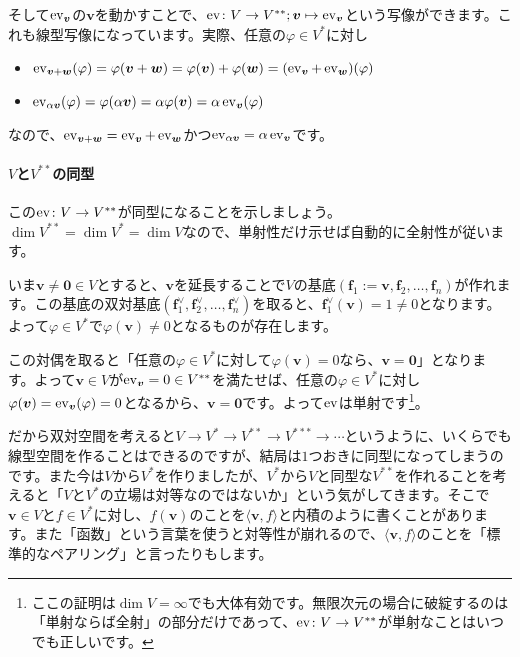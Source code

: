 そして$\operatorname{ev}_{\boldsymbol{v}}$の$\bm{v}$を動かすことで、$\operatorname{ev}\colon V\rightarrow V^{**}; \boldsymbol{v}\mapsto \operatorname{ev}_{\boldsymbol{v}}$という写像ができます。これも線型写像になっています。実際、任意の$\varphi \in V^*$に対し
\begin{itemize}
\item $\operatorname{ev}_{\boldsymbol{v} + \boldsymbol{w}}(\varphi) = \varphi(\boldsymbol{v} + \boldsymbol{w}) = \varphi(\boldsymbol{v}) + \varphi(\boldsymbol{w}) = (\operatorname{ev}_{\boldsymbol{v}} + \operatorname{ev}_{\boldsymbol{w}})(\varphi)$
\item $\operatorname{ev}_{\alpha\boldsymbol{v}}(\varphi) = \varphi(\alpha\boldsymbol{v}) = \alpha \varphi(\boldsymbol{v}) = \alpha \operatorname{ev}_{\boldsymbol{v}}(\varphi)$
\end{itemize}
なので、$\operatorname{ev}_{\boldsymbol{v} + \boldsymbol{w}} = \operatorname{ev}_{\boldsymbol{v}} + \operatorname{ev}_{\boldsymbol{w}}$かつ$\operatorname{ev}_{\alpha\boldsymbol{v}} = \alpha \operatorname{ev}_{\boldsymbol{v}}$です。

\paragraph{$V$と$V^{**}$の同型} この$\operatorname{ev}\colon V\rightarrow V^{**}$が同型になることを示しましょう。$\dim V^{**} = \dim V^* = \dim V$なので、単射性だけ示せば自動的に全射性が従います。

いま$\bm{v} \neq \bm{0} \in V$とすると、$\bm{v}$を延長することで$V$の基底$(\bm{f}_1 := \bm{v}, \bm{f}_2, \ldots, \bm{f}_n)$が作れます。この基底の双対基底$(\bm{f}^{\vee}_1, \bm{f}^{\vee}_2, \ldots, \bm{f}^{\vee}_n)$を取ると、$\bm{f}^{\vee}_1(\bm{v}) = 1 \neq 0$となります。よって$\varphi \in V^*$で$\varphi(\bm{v})\neq 0$となるものが存在します。

この対偶を取ると「任意の$\varphi \in V^*$に対して$\varphi(\bm{v}) = 0$なら、$\bm{v} = \bm{0}$」となります。よって$\bm{v} \in V$が$\operatorname{ev}_{\boldsymbol{v}} = 0 \in V^{**}$を満たせば、任意の$\varphi \in V^*$に対し$\varphi(\boldsymbol{v}) = \operatorname{ev}_{\boldsymbol{v}}(\varphi) = 0$となるから、$\bm{v} = \bm{0}$です。よって$\operatorname{ev}$は単射です\footnote{ここの証明は$\dim V = \infty$でも大体有効です。無限次元の場合に破綻するのは「単射ならば全射」の部分だけであって、$\operatorname{ev}\colon V\rightarrow V^{**}$が単射なことはいつでも正しいです。}。

だから双対空間を考えると$V \rightarrow V^* \rightarrow V^{**} \rightarrow V^{***} \rightarrow \cdots$というように、いくらでも線型空間を作ることはできるのですが、結局は$1$つおきに同型になってしまうのです。また今は$V$から$V^*$を作りましたが、$V^{*}$から$V$と同型な$V^{**}$を作れることを考えると「$V$と$V^*$の立場は対等なのではないか」という気がしてきます。そこで$\bm{v} \in V$と$f \in V^*$に対し、$f(\bm{v})$のことを$\langle \bm{v}, f \rangle$と内積のように書くことがあります。また「函数」という言葉を使うと対等性が崩れるので、$\langle \bm{v}, f \rangle$のことを「標準的なペアリング」と言ったりもします。

